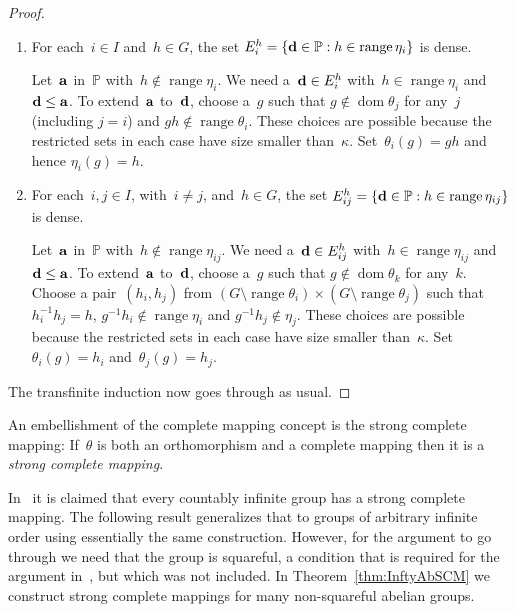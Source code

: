 \documentclass[12pt,a4paper]{article}
\DeclareMathOperator{\dom}{dom}
\DeclareMathOperator{\ran}{range}
\renewcommand{\P}{\mathbb{P}}
\begin{document}
\begin{proof}
\begin{enumerate}
\item For each~$i \in I$ and~$h \in G$, the set $E_i^h = \{ {\bf d} \in \P : h \in \ran \eta_i \}$ is dense.

Let~${\bf a}$ in~$\P$ with~$h \not\in \ran \eta_i$.  We need a~${\bf d} \in E_i^h$ with~$h \in \ran \eta_i$ and ${\bf d} \leq {\bf a}$.  To extend~${\bf a}$ to~${\bf d}$, choose a~$g$ such that $g \not\in \dom \theta_j$ for any~$j$ (including $j=i$) and $gh \not\in \ran \theta_i$.  These choices are possible because the restricted sets in each case have size smaller than~$\kappa$.  Set~$\theta_i(g) = gh$  and hence $\eta_i(g) = h$.   


\item For each~$i,j \in I$, with~$i \neq j$, and~$h \in G$, the set $E_{ij}^h = \{ {\bf d} \in \P : h \in \ran \eta_{ij} \}$ is dense.

Let~${\bf a}$ in~$\P$ with~$h \not\in \ran \eta_{ij}$.  We need a~${\bf d} \in E_{ij}^h$ with~$h \in \ran \eta_{ij}$ and ${\bf d} \leq {\bf a}$.  To extend~${\bf a}$ to~${\bf d}$, choose a~$g$ such that $g \not\in \dom \theta_k$ for any~$k$.   Choose a pair~$(h_i,h_j)$ from $(G \setminus \ran \theta_i) \times (G \setminus \ran \theta_j)$ such that~$h_i^{-1}h_j = h$, $g^{-1}h_i \not\in \ran \eta_i$ and $g^{-1}h_j \not\in \eta_j$. These choices are possible because the restricted sets in each case have size smaller than~$\kappa$.
 Set~$\theta_i(g) = h_i$ and~$\theta_j(g) = h_j$.


\end{enumerate}

The transfinite induction now goes through as usual.
\end{proof}






An embellishment of the complete mapping concept is the strong complete mapping:
If~$\theta$ is both an orthomorphism and a complete mapping then it is a {\em strong complete mapping}.   

In~\cite{Evans12} it is claimed that every countably infinite group has a strong complete mapping.  The following result generalizes that to groups of arbitrary infinite order using essentially the same construction.  However, for the argument to go through we need that the group is squareful, a condition that is required for the argument in~\cite{Evans12}, but which was not included.  In Theorem~\ref{thm:InftyAbSCM} we construct strong complete mappings for many non-squareful abelian groups.
\end{document}
